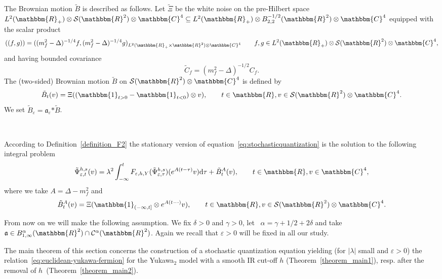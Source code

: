 \documentclass[11pt]{article}
\newcommand{\asterisk}{\mathord{*}}
\newcommand{\mathd}{\mathrm{d}}
\begin{document}
The Brownian motion $\tilde{B}$ is described as follows. Let $\tilde{\Xi}$ be
the white noise on the pre-Hilbert space $L^2 (\mathbbm{R}_+) \otimes
\mathcal{S} (\mathbbm{R}^2) \otimes \mathbbm{C}^4 \subseteq L^2 (\mathbbm{R}_+)
\otimes B_{2, 2}^{- 1 / 2} (\mathbbm{R}^2) \otimes \mathbbm{C}^4$ equipped with
the scalar product
\begin{equation}
  ((f, g)) = ((m_f^2 - \Delta)^{- 1 / 4} f, (m_f^2 - \Delta)^{- 1 / 4} g)_{L^2
  (\mathbbm{R}_+ \times \mathbbm{R}^2) \otimes \mathbbm{C}^4}
  \label{eq:scalarproduct} \qquad f, g \in L^2 (\mathbbm{R}_+) \otimes
  \mathcal{S} (\mathbbm{R}^2) \otimes \mathbbm{C}^4,
\end{equation}
and having bounded covariance
\[ \tilde{C}_f = (m^2_f - \Delta)^{- 1 / 2} C_f . \]
The (two-sided) Brownian motion $\tilde{B}$ on $\mathcal{S} (\mathbbm{R}^2)
\otimes \mathbbm{C}^4$ is defined by
\[ \tilde{B}_t (v) = \Xi ((\mathbbm{1}_{t > 0} -\mathbbm{1}_{t < 0}) \otimes v),
   \qquad t \in \mathbbm{R}, v \in \mathcal{S} (\mathbbm{R}^2) \otimes
   \mathbbm{C}^4 . \]
We set $\tilde{B}_{\varepsilon} = \mathfrak{a}_{\varepsilon} \asterisk
\tilde{B}$.

\

According to Definition~\ref{definition_F2} the stationary version of
equation~{\eqref{eq:stochasticquantization}} is the solution to the following
integral problem
\begin{equation}
  \tilde{\Psi}^{h, s}_{\varepsilon, t} (v) = \lambda^2 \int_{- \infty}^t
  F_{\varepsilon, h, Y} (\tilde{\Psi}_{\varepsilon, \tau}^{h, s}) (e^{A (t -
  \tau)} v) \mathd \tau + \tilde{B}^A_t (v), \label{eq:yukawas} \qquad t \in
  \mathbbm{R}, v \in \mathbbm{C}^4,
\end{equation}
where we take $A = \Delta - m_f^2$ and
\[ \tilde{B}^A_t (v) = \Xi (\mathbbm{1}_{(- \infty, t]} \otimes e^{A (t -
   \cdot)} v), \qquad t \in \mathbbm{R}, v \in \mathcal{S} (\mathbbm{R}^2)
   \otimes \mathbbm{C}^4 . \]
\begin{remark}
  \label{remark_alpha}From now on we will make the following assumption. We
  fix $\delta > 0$ and $\gamma > 0$, let \ $\alpha = \gamma + 1 / 2 + 2
  \delta$ and take $\mathfrak{a} \in B^{\alpha}_{1, \infty} (\mathbbm{R}^2)
  \cap \mathcal{C}^{\alpha} (\mathbbm{R}^2)$. Again we recall that $\varepsilon
  > 0$ will be fixed in all our study.
\end{remark}

The main theorem of this section concerns the construction of a stochastic
quantization equation yielding (for $| \lambda |$ small and $\varepsilon > 0$)
the relation~{\eqref{eq:euclidean-yukawa-fermion}} for the Yukawa$_2$ model
with a smooth IR cut-off $h$ (Theorem~\ref{theorem_main1}), resp. after the
removal of $h$~(Theorem~\ref{theorem_main2}).
\end{document}

